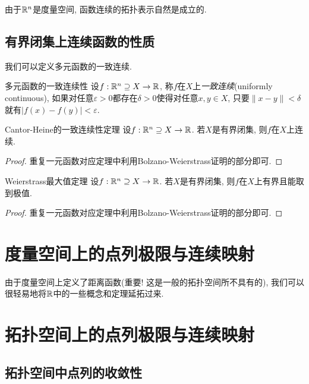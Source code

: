 由于$\mathbb{R} ^n$是度量空间, 函数连续的拓扑表示自然是成立的. 

\subsection{有界闭集上连续函数的性质}

我们可以定义多元函数的一致连续. 

\begin{definition}{多元函数的一致连续性}
	设$f:\mathbb{R} ^n \supseteq X \to \mathbb{R}$, 称$f$在$X$上\textit{一致连续}(uniformly continuous), 如果对任意$\varepsilon >0$都存在$\delta >0$使得对任意$x,y \in X$, 只要$\| x-y \|<\delta$就有$|f(x)-f(y)|<\varepsilon$. 
\end{definition}

\begin{theorem}{Cantor-Heine的一致连续性定理}
	设$f:\mathbb{R} ^n \supseteq X \to \mathbb{R}$. 若$X$是有界闭集, 则$f$在$X$上连续. 
\end{theorem}
\begin{proof}
	重复一元函数对应定理中利用Bolzano-Weierstrass证明的部分即可. 
\end{proof}

\begin{theorem}{Weierstrass最大值定理}
	设$f:\mathbb{R} ^n \supseteq X \to \mathbb{R}$. 若$X$是有界闭集, 则$f$在$X$上有界且能取到极值. 
\end{theorem}
\begin{proof}
	重复一元函数对应定理中利用Bolzano-Weierstrass证明的部分即可. 
\end{proof}



\newpage
\section{度量空间上的点列极限与连续映射}

由于度量空间上定义了距离函数(重要! 这是一般的拓扑空间所不具有的), 我们可以很轻易地将$\mathbb{R}$中的一些概念和定理延拓过来. 

\newpage
\section{拓扑空间上的点列极限与连续映射}




\subsection{拓扑空间中点列的收敛性}

